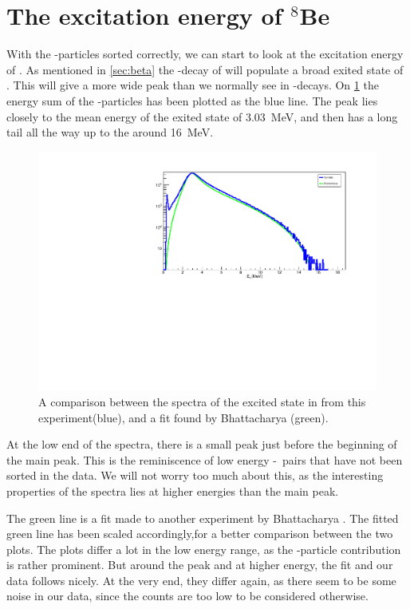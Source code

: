 \section{The excitation energy of $^8$Be}
With the \al-particles sorted correctly, we can start to look at the excitation energy of \ber. As mentioned in \cref{sec:beta} the \be-decay of \li will populate a broad exited state of \ber. This will give a more wide peak than we normally see in \al-decays. On \cref{fig:bata} the energy sum of the \al-particles has been plotted as the blue line. The peak lies closely to the mean energy of the exited state of \SI{3.03}{MeV}, and then has a long tail all the way up to the around \SI{16}{MeV}.
\begin{figure}[h]
	\centering
	\includegraphics[width=\linewidth]{../figures/bataraCompare.pdf}
	\caption{A comparison between the spectra of the excited state in \ber from this experiment(blue), and a fit found by Bhattacharya \cite{bata} (green).}
	\label{fig:bata}
\end{figure}
At the low end of the spectra, there is a small peak just before the beginning of the main peak. This is the reminiscence of low energy \be-\be\ pairs that have not been sorted in the data. We will not worry too much about this, as the interesting properties of the spectra lies at higher energies than the main peak.

The green line is a fit made to another experiment by Bhattacharya \cite{bata}. The fitted green line has been scaled accordingly,for a better comparison between the two plots. 
The plots differ a lot in the low energy range, as the \be-particle contribution is rather prominent. But around the peak and at higher energy, the fit and our data follows nicely. At the very end, they differ again, as there seem to be some noise in our data, since the counts are too low to be considered otherwise. 

